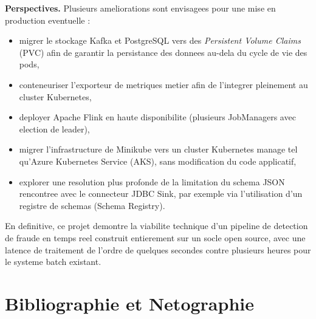 \textbf{Perspectives.} Plusieurs ameliorations sont envisagees pour une mise en
production eventuelle :
\begin{itemize}
    \item migrer le stockage Kafka et PostgreSQL vers des \textit{Persistent Volume
    Claims} (PVC) afin de garantir la persistance des donnees au-dela du cycle de vie
    des pods,
    \item conteneuriser l'exporteur de metriques metier afin de l'integrer pleinement
    au cluster Kubernetes,
    \item deployer Apache Flink en haute disponibilite (plusieurs JobManagers avec
    election de leader),
    \item migrer l'infrastructure de Minikube vers un cluster Kubernetes manage tel
    qu'Azure Kubernetes Service (AKS), sans modification du code applicatif,
    \item explorer une resolution plus profonde de la limitation du schema JSON
    rencontree avec le connecteur JDBC Sink, par exemple via l'utilisation d'un
    registre de schemas (Schema Registry).
\end{itemize}

En definitive, ce projet demontre la viabilite technique d'un pipeline de detection de
fraude en temps reel construit entierement sur un socle open source, avec une latence
de traitement de l'ordre de quelques secondes contre plusieurs heures pour le systeme
batch existant.

\newpage

\chapter*{Bibliographie et Netographie}

